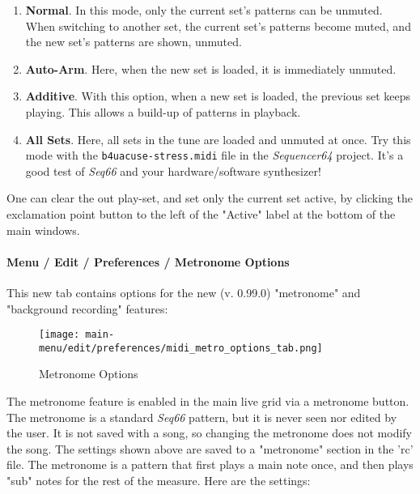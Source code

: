    \begin{enumerate}
      \item \textbf{Normal}.
         In this mode, only the current set's patterns can be unmuted.
         When switching to another set, the current set's patterns become
         muted, and the new set's patterns are shown, unmuted.
      \item \textbf{Auto-Arm}.
         Here, when the new set is loaded, it is immediately unmuted.
      \item \textbf{Additive}.
         With this option, when a new set is loaded, the previous set keeps
         playing. This allows a build-up of patterns in playback.
      \item \textbf{All Sets}.
         Here, all sets in the tune are loaded and unmuted at once.
         Try this mode with the \texttt{b4uacuse-stress.midi} file
         in the \textsl{Sequencer64} project.  It's a good test of
         \textsl{Seq66} and your hardware/software synthesizer!
   \end{enumerate}

   One can clear the out play-set, and set only the current set active, by
   clicking the exclamation point button to the left of the "Active" label at
   the bottom of the main windows.

\paragraph{Menu / Edit / Preferences / Metronome Options}
\label{paragraph:menu_edit_preferences_metronom_options}

   This new tab contains options for the new (v. 0.99.0)
   "metronome" and "background recording" features:

\begin{figure}[H]
   \centering 
   \texttt{[image: main-menu/edit/preferences/midi\_metro\_options\_tab.png]}
   \caption{Metronome Options}
   \label{fig:midi_metro_options_tab}
\end{figure}

   \setcounter{ItemCounter}{0}      %

   The metronome feature is enabled in the main live grid via a metronome
   button.
   The metronome is a standard \textsl{Seq66} pattern, but it is never seen
   nor edited by the user.
   It is not saved with a song, so changing the metronome does not modify the
   song.
   The settings shown above are saved to a "metronome" section in the 'rc'
   file.
   The metronome is a pattern that first plays a main note once, and then
   plays "sub" notes for the rest of the measure.
   Here are the settings:

